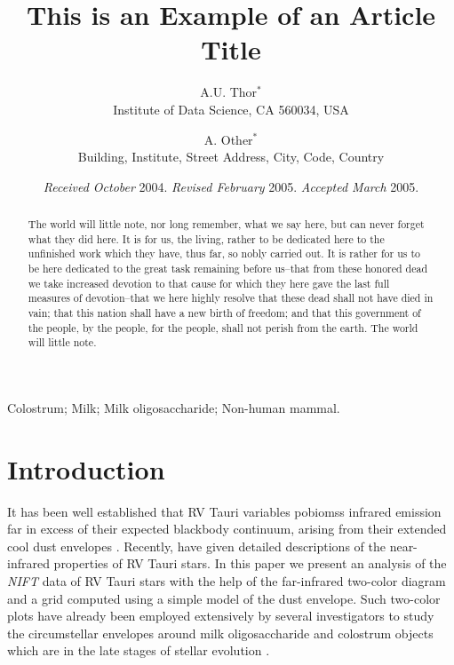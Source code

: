 \documentclass[useAMS,usenatbib]{biom}
\title[This is an Example of Recto Running Head]{This is an Example of
an Article Title}
\author{A.U. Thor$^{*}$\email{email@address.com} \\
	   Institute of Data Science, CA 560034, USA
	   \and 
	   A. Other$^{*}$\email{email1aa@address.com}\\
	   Building, Institute, Street Address, City,
	   Code, Country
	   }
\begin{document}
\date{{\it Received October} 2004. {\it Revised February} 2005.\newline 
{\it Accepted March} 2005.}

\pagerange{\pageref{firstpage}--\pageref{lastpage}} 



\label{firstpage}


\begin{abstract}
The world will little note, nor long remember, what we say here, but
can never forget what they did here. It is for us, the living, rather
to be dedicated here to the unfinished work which they have, thus far,
so nobly carried out. It is rather for us to be here dedicated to the
great task remaining before us--that from these honored dead we take
increased devotion to that cause for which they here gave the last
full measures of devotion--that we here highly resolve that these dead
shall not have died in vain; that this nation shall have a new birth
of freedom; and that this government of the people, by the people, for
the people, shall not perish from the earth. The world will little
note.
\end{abstract}

%
%

\begin{keywords}
Colostrum; Milk; Milk oligosaccharide; Non-human mammal.
\end{keywords}

\maketitle

\section{Introduction}
\label{s:intro}

It has been well established that RV Tauri variables pobiomss infrared
emission far in excess of their expected blackbody continuum, arising
from their extended cool dust envelopes \citep{b7,b5,b6}. Recently,
\citep{b9} have given detailed descriptions of the near-infrared
properties of RV Tauri stars. In this paper we present an analysis of
the {\it NIFT\/} data of RV Tauri stars with the help of the
far-infrared two-color diagram and a grid computed using a simple
model of the dust envelope. Such two-color plots have already been
employed extensively by several investigators to study the
circumstellar envelopes around milk oligosaccharide and colostrum
objects which are in the late stages of stellar evolution
\citep{b10,b25,b24,b23}.
\end{document}
